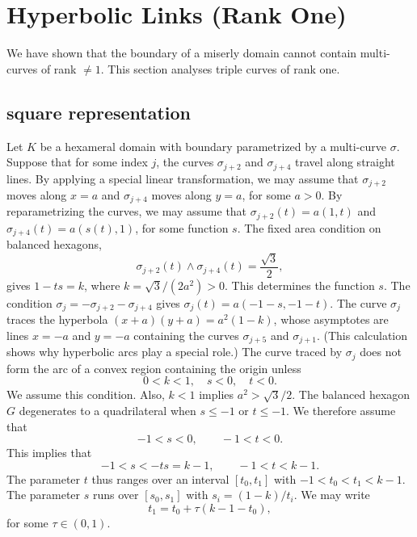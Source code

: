 \documentclass[11pt]{amsart}
\def\ta{{\tau}}
\begin{document}
\section{Hyperbolic Links (Rank One)}

We have shown that the boundary of a miserly domain cannot
contain multi-curves of rank $\ne 1$.  This section analyses triple
curves of rank one.


\subsection{square representation}

Let $K$ be a hexameral domain with boundary parametrized by a multi-curve $\sigma$.
Suppose that for some index $j$, the curves $\sigma_{j+2}$ and $\sigma_{j+4}$ travel along straight lines.
By applying a special linear transformation, we may assume that $\sigma_{j+2}$ moves along
$x=a$ and $\sigma_{j+4}$ moves along $y=a$, for some $a>0$.  
By reparametrizing the curves, we may assume
that $\sigma_{j+2}(t) = a(1,t)$ and $\sigma_{j+4}(t) = a(s(t),1)$, for some function $s$.  The fixed area condition 
on balanced hexagons, 
\begin{equation}
{\sigma_{j+2}(t)}\land{\sigma_{j+4}(t)}=\frac{\sqrt{3}}2,
\end{equation}
gives $1- t s = k$, where $k=\sqrt3/(2a^2) > 0$.  This determines the function $s$.  The condition $\sigma_{j} = -\sigma_{j+2} -\sigma_{j+4}$
gives $\sigma_{j}(t) = a (-1-s,-1-t)$.  The curve $\sigma_{j}$ 
traces the hyperbola $(x+a)(y+a) = a^2(1-k)$,
whose asymptotes are lines $x=-a$ and $y=-a$ containing the curves $\sigma_{j+5}$ and $\sigma_{j+1}$.
(This calculation shows why hyperbolic arcs play a special role.)
The curve traced by $\sigma_{j}$ does not form the arc of a convex region containing the origin unless
   \begin{equation}
   0 < k < 1,\quad s<0,\quad t < 0.
   \end{equation}
We assume this condition.
Also, $k<1$ implies $a^2 > \sqrt3/2$.  The balanced hexagon $G$ degenerates
to a quadrilateral when $s \le -1$ or $t\le -1$.  We therefore assume
that 
\begin{equation}
-1<s < 0,\qquad -1 < t < 0.
\end{equation}
  This implies that
\begin{equation}
-1 < s < -t s = k-1,\qquad -1 < t < k-1.
\end{equation}  
The parameter $t$ thus ranges
over an interval $[t_0,t_1]$ with $-1 < t_0 < t_1 < k-1$.  The parameter
$s$ runs over $[s_0,s_1]$ with $s_i = (1-k)/t_i$.  We may
write 
\begin{equation}
t_1 = t_0 + \ta (k-1-t_0),
\end{equation}
for some $\ta\in (0,1)$.
\end{document}
